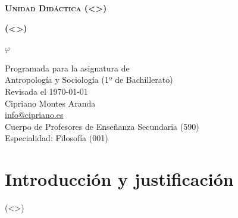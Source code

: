\documentclass[12pt]{article}
\newcommand{\numeroUD}{(<>)}
\newcommand{\tituloUD}{(<>)}
\begin{document}
\begin{titlepage}
        \begin{center}
                \vspace*{0.5cm}

                \Huge
		\textbf{\scshape Unidad Didáctica \numeroUD}

                \vspace{0.5cm}
                \LARGE
		\textbf{\tituloUD}\\
                \vfill

                \Huge
		{\fontsize{225pt}{45pt}\selectfont $\varphi$} %

                \vfill
                \large
		Programada para la asignatura de\\
		Antropología y Sociología (1º de Bachillerato)\\

                \vspace{0.25cm}
		\normalsize
		Revisada el \today\\ %

                \vspace{0.75cm}
		\Large
                Cipriano Montes Aranda\\
                \large
                \href{mailto:info@cipriano.es}{info@cipriano.es}\\ %
		\normalsize
                \vspace{0.2cm}
		Cuerpo de Profesores de Enseñanza Secundaria (590)\\
		Especialidad: Filosofía (001)
 \end{center}
\end{titlepage}

\pagestyle{empty}

\newpage
\mbox{}
\newpage
\mbox{}
\newpage


\onehalfspace
\tableofcontents %

\newpage
\mbox{}
\newpage

\normalsize

\pagestyle{fancy}

\section{Introducción y justificación}

(<>)


\end{document}

